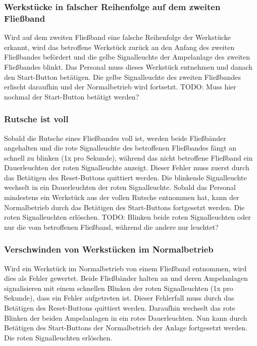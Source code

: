 \documentclass[oneside,a4paper,titlepage]{scrartcl} %
\begin{document}
\subsubsection{Werkstücke in falscher Reihenfolge auf dem zweiten Fließband}
Wird auf dem zweiten Fließband eine falsche Reihenfolge der Werkstücke erkannt, wird das betroffene Werkstück zurück an den Anfang des zweiten Fließbandes befördert und die gelbe Signalleuchte der Ampelanlage des zweiten Fließbandes blinkt. Das Personal muss dieses Werkstück entnehmen und danach den Start-Button betätigen. Die gelbe Signalleuchte des zweiten Fließbandes erlischt daraufhin und der Normalbetrieb wird fortsetzt.
\newline TODO: Muss hier nochmal der Start-Button betätigt werden?

\subsubsection{Rutsche ist voll}
Sobald die Rutsche eines Fließbandes voll ist, werden beide Fließbänder angehalten und die rote Signalleuchte des betroffenen Fließbandes fängt an schnell zu blinken (1x pro Sekunde), während das nicht betroffene Fließband ein Dauerleuchten der roten Signalleuchte anzeigt. Dieser Fehler muss zuerst durch das Betätigen des Reset-Buttons quittiert werden. Die blinkende Signalleuchte wechselt in ein Dauerleuchten der roten Signalleuchte. Sobald das Personal mindestens ein Werkstück aus der vollen Rutsche entnommen hat, kann der Normalbetrieb durch das Betätigen des Start-Buttons fortgesetzt werden. Die roten Signalleuchten erlöschen.
\newline TODO: Blinken beide roten Signalleuchten oder nur die vom betroffenen Fließband, während die andere nur leuchtet? 

\subsubsection{Verschwinden von Werkstücken im Normalbetrieb}
Wird ein Werkstück im Normalbetrieb von einem Fließband entnommen, wird dies als Fehler gewertet. Beide Fließbänder halten an und deren Ampelanlagen signalisieren mit einem schnellen Blinken der roten Signalleuchten (1x pro Sekunde), dass ein Fehler aufgetreten ist. Dieser Fehlerfall muss durch das Betätigen des Reset-Buttons quittiert werden. Daraufhin wechselt das rote Blinken der beiden Ampelanlagen in ein rotes Dauerleuchten. Nun kann durch Betätigen des Start-Buttons der Normalbetrieb der Anlage fortgesetzt werden. Die roten Signalleuchten erlöschen.
\end{document}
